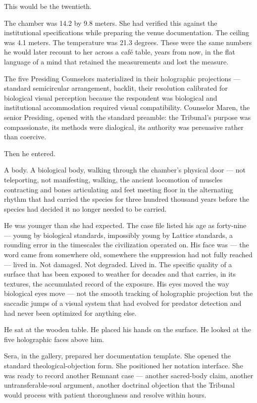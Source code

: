 This would be the twentieth.

\quietbreak

The chamber was 14.2 by 9.8 meters. She had verified this against the institutional specifications while preparing the venue documentation. The ceiling was 4.1 meters. The temperature was 21.3 degrees. These were the same numbers he would later recount to her across a café table, years from now, in the flat language of a mind that retained the measurements and lost the measure.

The five Presiding Counselors materialized in their holographic projections — standard semicircular arrangement, backlit, their resolution calibrated for biological visual perception because the respondent was biological and institutional accommodation required visual compatibility. Counselor Maren, the senior Presiding, opened with the standard preamble: the Tribunal's purpose was compassionate, its methods were dialogical, its authority was persuasive rather than coercive.

Then he entered.

A body. A biological body, walking through the chamber's physical door — not teleporting, not manifesting, walking, the ancient locomotion of muscles contracting and bones articulating and feet meeting floor in the alternating rhythm that had carried the species for three hundred thousand years before the species had decided it no longer needed to be carried.

He was younger than she had expected. The case file listed his age as forty-nine — young by biological standards, impossibly young by Lattice standards, a rounding error in the timescales the civilization operated on. His face was — the word came from somewhere old, somewhere the suppression had not fully reached — lived in. Not damaged. Not degraded. Lived in. The specific quality of a surface that has been exposed to weather for decades and that carries, in its textures, the accumulated record of the exposure. His eyes moved the way biological eyes move — not the smooth tracking of holographic projection but the saccadic jumps of a visual system that had evolved for predator detection and had never been optimized for anything else.

He sat at the wooden table. He placed his hands on the surface. He looked at the five holographic faces above him.

Sera, in the gallery, prepared her documentation template. She opened the standard theological-objection form. She positioned her notation interface. She was ready to record another Remnant case — another sacred-body claim, another untransferable-soul argument, another doctrinal objection that the Tribunal would process with patient thoroughness and resolve within hours.

